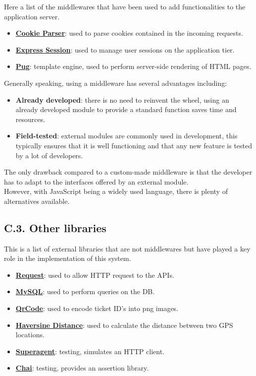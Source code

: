 Here a list of the middlewares that have been used to add functionalities to the application server.
\begin{itemize}
  \item \textbf{\href{https://www.npmjs.com/package/cookie-parser}{Cookie Parser}}: used to parse cookies contained in the incoming requests.
  \item \textbf{\href{https://www.npmjs.com/package/express-session}{Express Session}}: used to manage user sessions on the application tier.
  \item \textbf{\href{https://www.npmjs.com/package/pug}{Pug}}: template engine, used to perform server-side rendering of HTML pages.
\end{itemize}

Generally speaking, using a middleware has several advantages including:
\begin{itemize}
  \item \textbf{Already developed}: there is no need to reinvent the wheel, using an already developed module to provide a standard function saves time and resources.
  \item \textbf{Field-tested}: external modules are commonly used in development, this typically ensures that it is well functioning and that any new feature is tested by a lot of developers.
\end{itemize}
The only drawback compared to a custom-made middleware is that the developer has to adapt to the interfaces offered by an external module.\\
However, with JavaScript being a widely used language, there is plenty of alternatives available.

\subsection{C.3. Other libraries}

This is a list of external libraries that are not middlewares but have played a key role in the implementation of this system.
\begin{itemize}
  \item \textbf{\href{https://www.npmjs.com/package/request}{Request}}: used to allow HTTP request to the APIs.
  \item \textbf{\href{https://www.npmjs.com/package/mysql}{MySQL}}: used to perform queries on the DB.
  \item \textbf{\href{https://www.npmjs.com/package/qrcode}{QrCode}}: used to encode ticket ID's into png images.
  \item \textbf{\href{https://www.npmjs.com/package/haversine-distance}{Haversine Distance}}: used to calculate the distance between two GPS locations.
  \item \textbf{\href{https://www.npmjs.com/package/superagent}{Superagent}}: testing, simulates an HTTP client.
  \item \textbf{\href{https://www.npmjs.com/package/chai}{Chai}}: testing, provides an assertion library.
\end{itemize}

